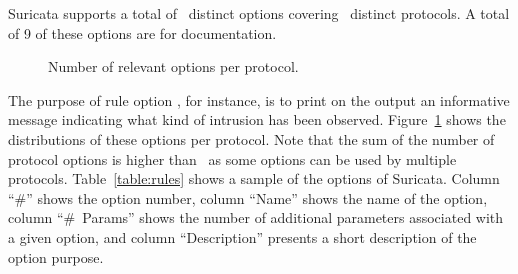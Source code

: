 \documentclass[runningheads]{llncs}
\begin{document}
Suricata supports a total of \totoptions\ distinct options covering
\numproto\ distinct protocols. A total of 9 of these options are for
documentation.
\begin{figure}
  \centering
  \vspace{-5ex}
  \caption{\label{fig:distribution-rules-protocol}Number of relevant options per protocol.}
\end{figure}
The purpose of rule option , for instance, is to print on
the output an informative message indicating what kind of intrusion
has been observed. Figure~\ref{fig:distribution-rules-protocol} shows
the distributions of these options per protocol. Note that the sum of
the number of protocol options is higher than \totoptions\ as some
options can be used by multiple protocols. Table~\ref{table:rules}
shows a sample of the options of Suricata. Column ``\#'' shows the
option number, column ``Name'' shows the name of the option, column
``\#~Params'' shows the number of additional parameters associated
with a given option, and column ``Description'' presents a short
description of the option purpose. 
\end{document}
